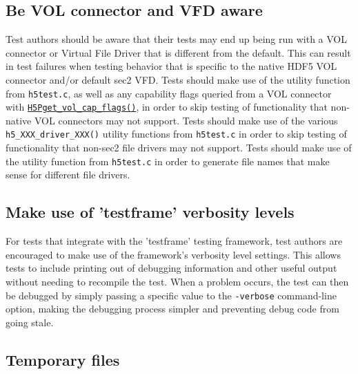 \documentclass[../HDF5_RFC.tex]{subfiles}
\begin{document}
\subsection{Be VOL connector and VFD aware}

Test authors should be aware that their tests may end up being run with a VOL connector or Virtual File
Driver that is different from the default. This can result in test failures when testing behavior that
is specific to the native HDF5 VOL connector and/or default sec2 VFD. Tests should make use of the
 utility function from \texttt{h5test.c}, as well as any capability
flags queried from a VOL connector with \href{https://support.hdfgroup.org/documentation/hdf5/latest/group___f_a_p_l.html#ga2ad4dc5c6e5e4271334a7b1c6ee0777d}{\texttt{H5Pget\_vol\_cap\_flags()}}, in order to skip testing of functionality that non-native VOL connectors may not support. Tests should make use of the various \texttt{h5\_XXX\_driver\_XXX()} utility functions from \texttt{h5test.c} in order to skip testing of 
functionality that non-sec2 file drivers may not support. Tests should make use of the  utility function from \texttt{h5test.c} in order to generate file names that
make sense for different file drivers.

\subsection{Make use of 'testframe' verbosity levels}

For tests that integrate with the 'testframe' testing framework, test authors are encouraged to make use
of the framework's verbosity level settings. This allows tests to include printing out of debugging
information and other useful output without needing to recompile the test. When a problem occurs, the test
can then be debugged by simply passing a specific value to the \texttt{-verbose} command-line option,
making the debugging process simpler and preventing debug code from going stale.

\subsection{Temporary files}
\end{document}
